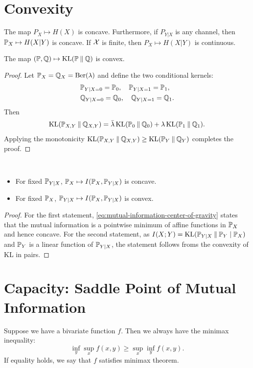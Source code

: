 \section{Convexity}

\begin{theorem}[Entropy]
    The map $P_X\mapsto H(X)$ is concave.
    Furthermore, if $P_{Y|X}$ is any channel, then $\mathbb{P}_X\mapsto H(X|Y)$ is concave.
    If $\mathcal{X}$ is finite, then $P_X\mapsto H(X|Y)$ is continuous.
\end{theorem}

\begin{theorem}[KL divergence]
    The map $(\mathbb{P},\mathbb{Q})\mapsto \operatorname{KL}(\mathbb{P}\mathbin{\|}\mathbb{Q})$ is convex.
\end{theorem}
\begin{proof}
    Let $\mathbb{P}_X=\mathbb{Q}_X=\operatorname{Ber}(\lambda)$ and define the two conditional kernels:
    \begin{align*}
        &\mathbb{P}_{Y|X=0}=\mathbb{P}_0,\quad \mathbb{P}_{Y|X=1}=\mathbb{P}_1,\\
        &\mathbb{Q}_{Y|X=0}=\mathbb{Q}_0,\quad \mathbb{Q}_{Y|X=1}=\mathbb{Q}_1.
    \end{align*}
    Then 
    \[\operatorname{KL}(\mathbb{P}_{X,Y}\mathbin{\|}\mathbb{Q}_{X,Y})=\bar{\lambda}\operatorname{KL}(\mathbb{P}_0\mathbin{\|}\mathbb{Q}_0)+\lambda \operatorname{KL}(\mathbb{P}_1\mathbin{\|}\mathbb{Q}_1).\]
    Applying the monotonicity $\operatorname{KL}(\mathbb{P}_{X,Y}\mathbin{\|}\mathbb{Q}_{X,Y})\geq \operatorname{KL}(\mathbb{P}_Y\mathbin{\|}\mathbb{Q}_Y)$ completes the proof.
\end{proof}

\begin{theorem}
    \
    \begin{itemize}
        \item For fixed $\mathbb{P}_{Y|X}$, $\mathbb{P}_X\mapsto I(\mathbb{P}_X,\mathbb{P}_{Y|X})$ is concave.
        \item For fixed $\mathbb{P}_X$, $\mathbb{P}_{Y|X}\mapsto I(\mathbb{P}_X,\mathbb{P}_{Y|X})$ is convex.
    \end{itemize}
\end{theorem}
\begin{proof}
    For the first statement, \eqref{eq:mutual-information-center-of-gravity} states that the mutual information is a pointwise minimum of affine functions in $\mathbb{P}_X$ and hence concave.
    For the second statement, as $I(X;Y)=\operatorname{KL}(\mathbb{P}_{Y|X}\mathbin{\|} \mathbb{P}_Y\mid\mathbb{P}_X)$ and $\mathbb{P}_Y$ is a linear function of $\mathbb{P}_{Y|X}$, the statement follows froms the convexity of KL in pairs.
\end{proof}

\section{Capacity: Saddle Point of Mutual Information}
Suppose we have a bivariate function $f$. Then we always have the minimax inequality:
\[\inf_y\sup_x f(x,y)\geq \sup_x\inf_y f(x,y).\]
If equality holds, we say that $f$ satisfies minimax theorem.


